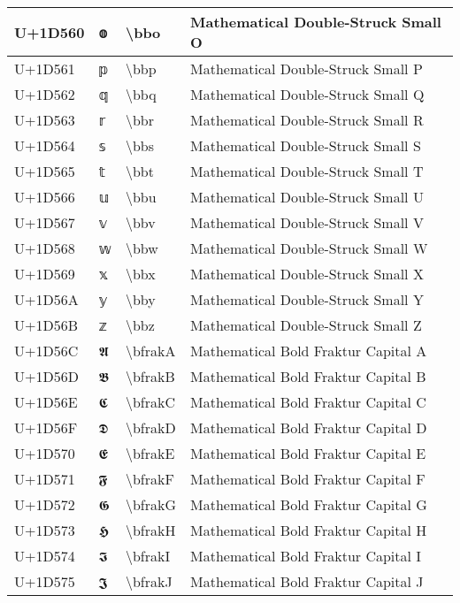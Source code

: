 \begin{table}[h]
\begin{tabulary}{\linewidth}{|L|L|L|L|}
\hline
U+1D560 & 𝕠 & {\textbackslash}bbo & Mathematical Double-Struck Small O \\
\hline
U+1D561 & 𝕡 & {\textbackslash}bbp & Mathematical Double-Struck Small P \\
\hline
U+1D562 & 𝕢 & {\textbackslash}bbq & Mathematical Double-Struck Small Q \\
\hline
U+1D563 & 𝕣 & {\textbackslash}bbr & Mathematical Double-Struck Small R \\
\hline
U+1D564 & 𝕤 & {\textbackslash}bbs & Mathematical Double-Struck Small S \\
\hline
U+1D565 & 𝕥 & {\textbackslash}bbt & Mathematical Double-Struck Small T \\
\hline
U+1D566 & 𝕦 & {\textbackslash}bbu & Mathematical Double-Struck Small U \\
\hline
U+1D567 & 𝕧 & {\textbackslash}bbv & Mathematical Double-Struck Small V \\
\hline
U+1D568 & 𝕨 & {\textbackslash}bbw & Mathematical Double-Struck Small W \\
\hline
U+1D569 & 𝕩 & {\textbackslash}bbx & Mathematical Double-Struck Small X \\
\hline
U+1D56A & 𝕪 & {\textbackslash}bby & Mathematical Double-Struck Small Y \\
\hline
U+1D56B & 𝕫 & {\textbackslash}bbz & Mathematical Double-Struck Small Z \\
\hline
U+1D56C & 𝕬 & {\textbackslash}bfrakA & Mathematical Bold Fraktur Capital A \\
\hline
U+1D56D & 𝕭 & {\textbackslash}bfrakB & Mathematical Bold Fraktur Capital B \\
\hline
U+1D56E & 𝕮 & {\textbackslash}bfrakC & Mathematical Bold Fraktur Capital C \\
\hline
U+1D56F & 𝕯 & {\textbackslash}bfrakD & Mathematical Bold Fraktur Capital D \\
\hline
U+1D570 & 𝕰 & {\textbackslash}bfrakE & Mathematical Bold Fraktur Capital E \\
\hline
U+1D571 & 𝕱 & {\textbackslash}bfrakF & Mathematical Bold Fraktur Capital F \\
\hline
U+1D572 & 𝕲 & {\textbackslash}bfrakG & Mathematical Bold Fraktur Capital G \\
\hline
U+1D573 & 𝕳 & {\textbackslash}bfrakH & Mathematical Bold Fraktur Capital H \\
\hline
U+1D574 & 𝕴 & {\textbackslash}bfrakI & Mathematical Bold Fraktur Capital I \\
\hline
U+1D575 & 𝕵 & {\textbackslash}bfrakJ & Mathematical Bold Fraktur Capital J \\

\end{tabulary}
\end{table}
